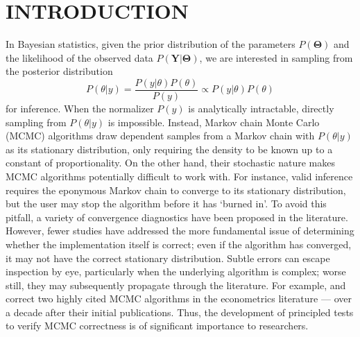 \documentclass[a4paper,12pt]{article}
\begin{document}
\newpage
{} %

\newpage

\section{INTRODUCTION}
\label{section:intro}
In Bayesian statistics, given the prior distribution of the parameters $P(\mathbf{\Theta})$ and the likelihood of the observed data $P(\mathbf{Y} | \mathbf{\Theta})$, we are interested in sampling from the posterior distribution
\begin{equation}
    P(\theta | y) = \frac{P(y | \theta)P(\theta)}{P(y)} \propto P(y | \theta)P(\theta)
    \label{eq:posterior}
\end{equation}
for inference. When the normalizer $P(y)$ is analytically intractable, directly sampling from $P(\theta | y)$ is impossible. Instead, Markov chain Monte Carlo (MCMC) algorithms draw dependent samples from a Markov chain with $P(\theta | y)$ as its stationary distribution, only requiring the density to be known up to a constant of proportionality. On the other hand, their stochastic nature makes MCMC algorithms potentially difficult to work with. For instance, valid inference requires the eponymous Markov chain to converge to its stationary distribution, but the user may stop the algorithm before it has `burned in'. To avoid this pitfall, a variety of convergence diagnostics have been proposed in the literature. However, fewer studies have addressed the more fundamental issue of determining whether the implementation itself is correct; even if the algorithm has converged, it may not have the correct stationary distribution. Subtle errors can escape inspection by eye, particularly when the underlying algorithm is complex; worse still, they may subsequently propagate through the literature. For example, \cite{del_negro_time_2015} and \cite{karlsson_corrigendum_2017} correct two highly cited MCMC algorithms in the econometrics literature --- over a decade after their initial publications. Thus, the development of principled tests to verify MCMC correctness is of significant importance to researchers.
\end{document}
